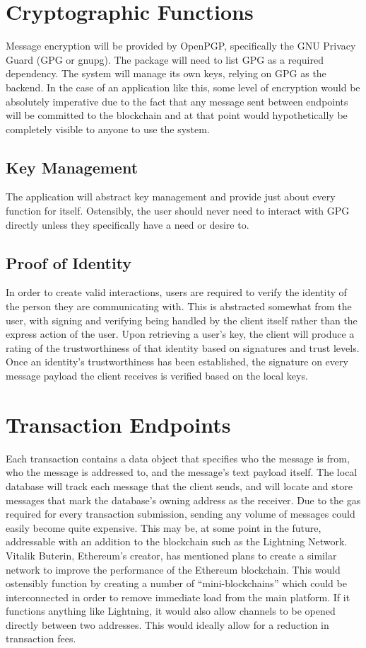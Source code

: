 \documentclass[]{article}
\begin{document}
\section{Cryptographic Functions}
Message encryption will be provided by OpenPGP, specifically the GNU Privacy Guard (GPG or gnupg). The package will need to list GPG as a required dependency. The system will manage its own keys, relying on GPG as the backend. In the case of an application like this, some level of encryption would be absolutely imperative due to the fact that any message sent between endpoints will be committed to the blockchain and at that point would hypothetically be completely visible to anyone to use the system.
\subsection{Key Management}
The application will abstract key management and provide just about every function for itself. Ostensibly, the user should never need to interact with GPG directly unless they specifically have a need or desire to.
\subsection{Proof of Identity}
In order to create valid interactions, users are required to verify the identity of the person they are communicating with. This is abstracted somewhat from the user, with signing and verifying being handled by the client itself rather than the express action of the user. Upon retrieving a user's key, the client will produce a rating of the trustworthiness of that identity based on signatures and trust levels. Once an identity's trustworthiness has been established, the signature on every message payload the client receives is verified based on the local keys.

\section{Transaction Endpoints}
Each transaction contains a data object that specifies who the message is from, who the message is addressed to, and the message's text payload itself. The local database will track each message that the client sends, and will locate and store messages that mark the database's owning address as the receiver. Due to the gas required for every transaction submission, sending any volume of messages could easily become quite expensive. This may be, at some point in the future, addressable with an addition to the blockchain such as the Lightning Network. Vitalik Buterin, Ethereum's creator, has mentioned plans to create a similar network to improve the performance of the Ethereum blockchain. This would ostensibly function by creating a number of ``mini-blockchains'' which could be interconnected in order to remove immediate load from the main platform. If it functions anything like Lightning, it would also allow channels to be opened directly between two addresses. This would ideally allow for a reduction in transaction fees.
\end{document}
